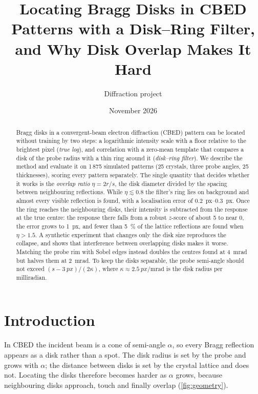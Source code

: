 \documentclass[11pt,a4paper]{article}
\title{Locating Bragg Disks in CBED Patterns with a Disk--Ring Filter,\\ and Why Disk Overlap Makes It Hard}
\author{Diffraction project}
\date{November 2026}
\begin{document}
\maketitle

\begin{abstract}
\noindent
Bragg disks in a convergent-beam electron diffraction (CBED) pattern can be located without training by two steps:
a logarithmic intensity scale with a floor relative to the brightest pixel (\emph{true log}), and correlation with a
zero-mean template that compares a disk of the probe radius with a thin ring around it (\emph{disk--ring filter}). We
describe the method and evaluate it on 1\,875 simulated patterns (25 crystals, three probe angles, 25 thicknesses), scoring
every pattern separately. The single quantity that decides whether it works is the \emph{overlap ratio}
$\eta = 2r/s$, the disk diameter divided by the spacing between neighbouring reflections. While $\eta \lesssim 0.8$ the
filter's ring lies on background and almost every visible reflection is found, with a localisation error of
\SIrange{0.2}{0.3}{px}. Once the ring reaches the neighbouring disks, their intensity is subtracted from the response at the
true centre: the response there falls from a robust $z$-score of about 5 to near 0, the error grows to \SI{1}{px}, and
fewer than \SI{5}{\percent} of the lattice reflections are found when $\eta > 1.5$. A synthetic experiment that changes
only the disk size reproduces the collapse, and shows that interference between overlapping disks makes it worse. Matching
the probe rim with Sobel edges instead doubles the centres found at \SI{4}{\milli\radian} but halves them at
\SI{2}{\milli\radian}. To keep
the disks separable, the probe semi-angle should not exceed $(s - \SI{3}{px})/(2\kappa)$, where
$\kappa \approx \SI{2.5}{px\per\milli\radian}$ is the disk radius per milliradian.
\end{abstract}

{\small\tableofcontents}

\section{Introduction}\label{sec:intro}
In CBED the incident beam is a cone of semi-angle $\alpha$, so every Bragg reflection appears as a disk rather than a spot.
The disk radius is set by the probe and grows with $\alpha$; the distance between disks is set by the crystal lattice and
does not. Locating the disks therefore becomes harder as $\alpha$ grows, because neighbouring disks approach, touch and
finally overlap (\cref{fig:geometry}).
\end{document}
